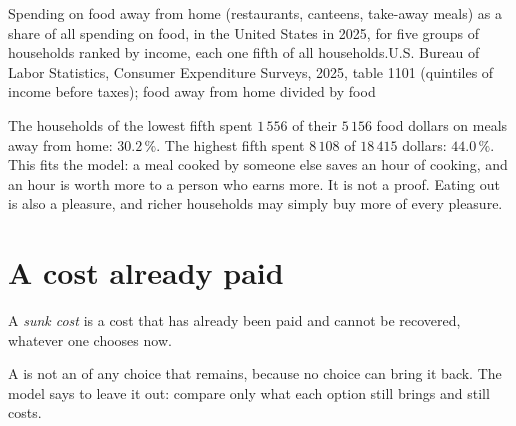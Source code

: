 \begin{omchart}{Spending on food away from home (restaurants, canteens, take-away
meals) as a share of all spending on food, in the United States in 2025, for five
groups of households ranked by income, each one fifth of all
households.}{U.S. Bureau of Labor Statistics, Consumer Expenditure Surveys, 2025,
table 1101 (quintiles of income before taxes); food away from home divided by
food}
\end{omchart}

The households of the lowest fifth spent $1\,556$ of their $5\,156$ food dollars on
meals away from home: $30.2\,\%$. The highest fifth spent $8\,108$ of $18\,415$
dollars: $44.0\,\%$. This fits the model: a meal cooked by someone else saves an
hour of cooking, and an hour is worth more to a person who earns more. It is not a
proof. Eating out is also a pleasure, and richer households may simply buy more of
every pleasure.

\section{A cost already paid}

\begin{definition}\label{def:g7:scarcity-and-opportunity-cost:sunk-cost}
A \emph{sunk cost} is a cost that has already been paid and cannot
be recovered, whatever one chooses now.
\end{definition}

A  is not an  of any choice that remains, because no choice
can bring it back. The model says to leave it out: compare only what each option
still brings and still costs.

